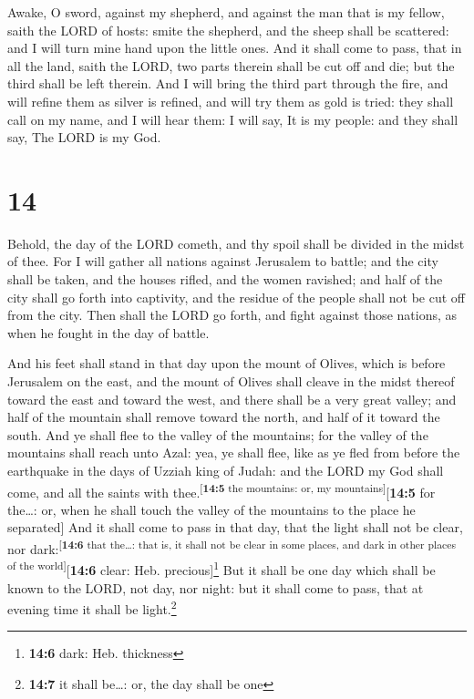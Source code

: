  Awake, O sword, against my shepherd, and against the man
that is my fellow, saith the LORD of hosts: smite the shepherd, and the
sheep shall be scattered: and I will turn mine hand upon the little
ones.  And it shall come to pass, that in all the land,
saith the LORD, two parts therein shall be cut off and die; but the
third shall be left therein.  And I will bring the third
part through the fire, and will refine them as silver is refined, and
will try them as gold is tried: they shall call on my name, and I will
hear them: I will say, It is my people: and they shall say, The LORD is
my God.

\hypertarget{section-13}{%
\section{14}\label{section-13}}

 Behold, the day of the LORD cometh, and thy spoil shall
be divided in the midst of thee.  For I will gather all
nations against Jerusalem to battle; and the city shall be taken, and
the houses rifled, and the women ravished; and half of the city shall go
forth into captivity, and the residue of the people shall not be cut off
from the city.  Then shall the LORD go forth, and fight
against those nations, as when he fought in the day of battle.

 And his feet shall stand in that day upon the mount of
Olives, which is before Jerusalem on the east, and the mount of Olives
shall cleave in the midst thereof toward the east and toward the west,
and there shall be a very great valley; and half of the mountain shall
remove toward the north, and half of it toward the south. 
And ye shall flee to the valley of the mountains; for the valley of the
mountains shall reach unto Azal: yea, ye shall flee, like as ye fled
from before the earthquake in the days of Uzziah king of Judah: and the
LORD my God shall come, and all the saints with
thee.\textsuperscript{{[}\textbf{14:5} the mountains: or, my
mountains{]}}{[}\textbf{14:5} for the\ldots: or, when he shall touch the
valley of the mountains to the place he separated{]}  And
it shall come to pass in that day, that the light shall not be clear,
nor dark:\textsuperscript{{[}\textbf{14:6} that the\ldots: that is, it
shall not be clear in some places, and dark in other places of the
world{]}}{[}\textbf{14:6} clear: Heb. precious{]}\footnote{\textbf{14:6}
  dark: Heb. thickness}  But it shall be one day which
shall be known to the LORD, not day, nor night: but it shall come to
pass, that at evening time it shall be light.\footnote{\textbf{14:7} it
  shall be\ldots: or, the day shall be one}

